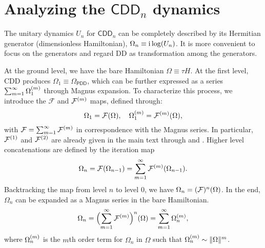 \documentclass[pra,reprint,superscriptaddress]{revtex4-2}
\newcommand{\CDDn}{\mathsf{CDD}_n}
\begin{document}
\section{Analyzing the \texorpdfstring{$\CDDn$}{CDDn} dynamics}\label{app:CDD}

The unitary dynamics $U_n$ for $\CDDn$ can be completely described by its Hermitian generator (dimensionless Hamiltonian), $\Omega_n \equiv\mathrm{i}\log(U_n)$.
It is more convenient to focus on the generators and regard 
DD as transformation among the generators.

At the ground level, we have the bare Hamiltonian $\Omega\equiv\tau H$.
At the first level, CDD produces $\Omega_1\equiv \Omega_{\mathsf{PDD}}$, which can be further expressed as a series
 $\sum_{m=1}^\infty \Omega_1^{(m)}$ through Magnus expansion. 
 To characterize this process, we introduce the $\mathcal{F}$ and $\mathcal{F}^{(m)}$ 
 maps, defined through:
 \begin{equation}
  \Omega_1 = \mathcal{F}(\Omega), \quad \Omega_1^{(m)} = \mathcal{F}^{(m)}(\Omega),
 \end{equation}
with $\mathcal{F} = \sum_{m=1}^\infty \mathcal{F}^{(m)}$
in correspondence with the Magnus series. In particular, $\mathcal{F}^{(1)}$ and $\mathcal{F}^{(2)}$ are already given in the main text through  and . 
Higher level concatenations are defined by the iteration map 
\begin{equation}\label{eq:CDD-update}
    \Omega_n = \mathcal{F}(\Omega_{n-1}) = \sum_{m=1}^\infty \mathcal{F}^{(m)}(\Omega_{n-1}).
\end{equation}
Backtracking the map from level $n$ to level $0$, we have
$\Omega_{n} = (\mathcal{F})^{n}(\Omega)$. In the end, 
$\Omega_{n}$ can be expanded as a Magnus series in the bare Hamiltonian. 
\begin{equation}\label{eq:CDD-magnus}
\Omega_{n} =\Bigl(\sum_{m=1}^\infty \mathcal{F}^{(m)}\Bigr)^{n}(\Omega)=\sum_{m=1}^\infty \Omega_{n}^{(m)},
\end{equation}
where $\Omega_{n}^{(m)}$ is the $m$th order term for $\Omega_{n}$ in $\Omega$ such that $\Omega_{n}^{(m)}  \sim  \Vert {\Omega} \Vert^m$.
\end{document}
